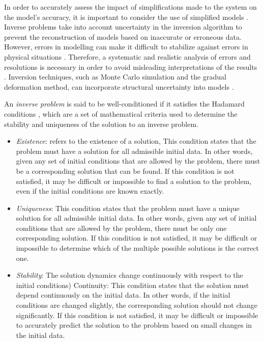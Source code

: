 In order to accurately assess the impact of simplifications made to the system on the model's accuracy, it is important to consider the use of simplified models \cite{Reid1998Admissible}. Inverse problems take into account uncertainty in the inversion algorithm to prevent the reconstruction of models based on inaccurate or erroneous data. However, errors in modelling can make it difficult to stabilize against errors in physical situations \cite{Payne1987ON}. Therefore, a systematic and realistic analysis of errors and resolutions is necessary in order to avoid misleading interpretations of the results \cite{trampertGlobalSeismicTomography1998}. Inversion techniques, such as Monte Carlo simulation and the gradual deformation method, can incorporate structural uncertainty into models \cite{athensStochasticInversionGravity2022}. 

An \emph{inverse problem} is said to be well-conditioned if it satisfies the Hadamard conditions \cite{hadamard1902problemes}, which are a set of mathematical criteria used to determine the stability and uniqueness of the solution to an inverse problem.

\begin{itemize}
    \item \emph{Existence}: refers to the existence of a solution, This condition states that the problem must have a solution for all admissible initial data. In other words, given any set of initial conditions that are allowed by the problem, there must be a corresponding solution that can be found. If this condition is not satisfied, it may be difficult or impossible to find a solution to the problem, even if the initial conditions are known exactly.

    \item \emph{Uniqueness}: This condition states that the problem must have a unique solution for all admissible initial data. In other words, given any set of initial conditions that are allowed by the problem, there must be only one corresponding solution. If this condition is not satisfied, it may be difficult or impossible to determine which of the multiple possible solutions is the correct one.

    \item \emph{Stability}: The solution dynamics change continuously with respect to the initial conditions)
    Continuity: This condition states that the solution must depend continuously on the initial data. In other words, if the initial conditions are changed slightly, the corresponding solution should not change significantly. If this condition is not satisfied, it may be difficult or impossible to accurately predict the solution to the problem based on small changes in the initial data.
\end{itemize}

